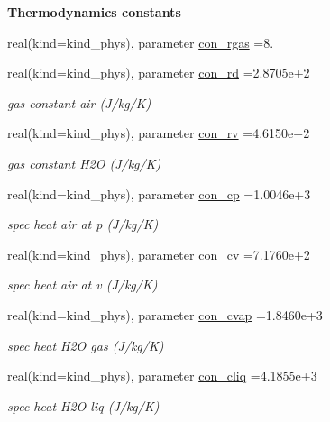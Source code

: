 \begin{Indent}{\bf Thermodynamics constants}\par
\begin{DoxyCompactItemize}
\item 
real(kind=kind\+\_\+phys), parameter \hyperlink{namespacephyscons_ab693404d71b608617bcb6efe24cb57c6}{con\+\_\+rgas} =8.
\item 
real(kind=kind\+\_\+phys), parameter \hyperlink{namespacephyscons_ac7dc37b0005878c5fd2f200720ffb059}{con\+\_\+rd} =2.\+8705e+2
\begin{DoxyCompactList}\small\item\em gas constant air (J/kg/K) \end{DoxyCompactList}\item 
real(kind=kind\+\_\+phys), parameter \hyperlink{namespacephyscons_a3ae962da4c7a9cb83c4a2abe743696b0}{con\+\_\+rv} =4.\+6150e+2
\begin{DoxyCompactList}\small\item\em gas constant H2O (J/kg/K) \end{DoxyCompactList}\item 
real(kind=kind\+\_\+phys), parameter \hyperlink{namespacephyscons_a29704d9a27091d61724e1a0c654d0f10}{con\+\_\+cp} =1.\+0046e+3
\begin{DoxyCompactList}\small\item\em spec heat air at p (J/kg/K) \end{DoxyCompactList}\item 
real(kind=kind\+\_\+phys), parameter \hyperlink{namespacephyscons_aff20707d9ec92cc8a555f7a4e63cb1dd}{con\+\_\+cv} =7.\+1760e+2
\begin{DoxyCompactList}\small\item\em spec heat air at v (J/kg/K) \end{DoxyCompactList}\item 
real(kind=kind\+\_\+phys), parameter \hyperlink{namespacephyscons_a0fc6465a87263f2fd3576365c485f81e}{con\+\_\+cvap} =1.\+8460e+3
\begin{DoxyCompactList}\small\item\em spec heat H2O gas (J/kg/K) \end{DoxyCompactList}\item 
real(kind=kind\+\_\+phys), parameter \hyperlink{namespacephyscons_a63660b93c455c1f072ade649bf87cadc}{con\+\_\+cliq} =4.\+1855e+3
\begin{DoxyCompactList}\small\item\em spec heat H2O liq (J/kg/K) \end{DoxyCompactList}\item 

\end{DoxyCompactItemize}
\end{Indent}

